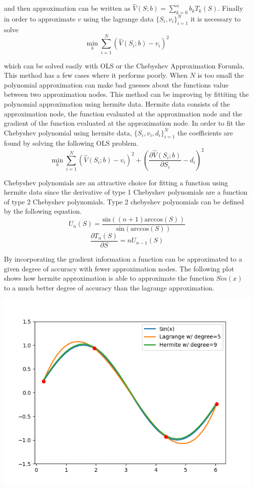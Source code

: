 \documentclass[12pt]{article}
\begin{document}
and then approximation can be written as $\hat{V}(S;b)=\sum_{k=0}^n b_k T_k(S)$.
Finally in order to approximate $v$ using the lagrange data $\{S_i,v_i\}_{i=1}^N$ it is necessary to solve
\begin{equation*}
  \min_b \sum_{i=1}^N (\hat{V}(S_i;b)-v_i)^2
\end{equation*}

which can be solved easily with OLS or the Chebyshev Approximation Forumla. This method has a few cases where it performs poorly. When $N$ is too small the polynomial approximation can make bad guesses about the functions value between two approximation nodes. This method can be improving by fittiting the polynomial approximation using hermite data. Hermite data consists of the approximation node, the function evaluated at the approximation node and the gradient of the function evaluated at the approximation node. In order to fit the Chebyshev polynomial using hermite data, $\{S_i,v_i,d_i\}_{i=1}^N$ the coefficients are found by solving the following OLS problem.
\begin{equation*}
  \min_b \sum_{i=1}^N (\hat{V}(S_i;b)-v_i)^2 + (\frac{\partial \hat{V}(S_i;b)}{\partial S_i} - d_i)^2
\end{equation*}

Chebyshev polynomials are an attractive choice for fitting a function using hermite data since the derivative of type 1 Chebyshev polynomials are a function of type 2 Chebyshev polynomials. Type 2 chebyshev polynomials can be defined by the following equation.
\begin{equation*}
  U_n(S) = \frac{\text{sin}((n+1) \text{arccos}(S))}{\text{sin}(\text{arccos}(S))}
\end{equation*}
\begin{equation*}
  \frac{\partial T_n(S)}{\partial S} = n U_{n-1}(S)
\end{equation*}

By incorporating the gradient information a function can be approximated to a given degree of accuracy with fewer approximation nodes. The following plot shows how hermite approximation is able to approximate the function $Sin(x)$ to a much better degree of accuracy than the lagrange approximation.

\includegraphics{plot_Cheb_Sin_Func}
\end{document}

